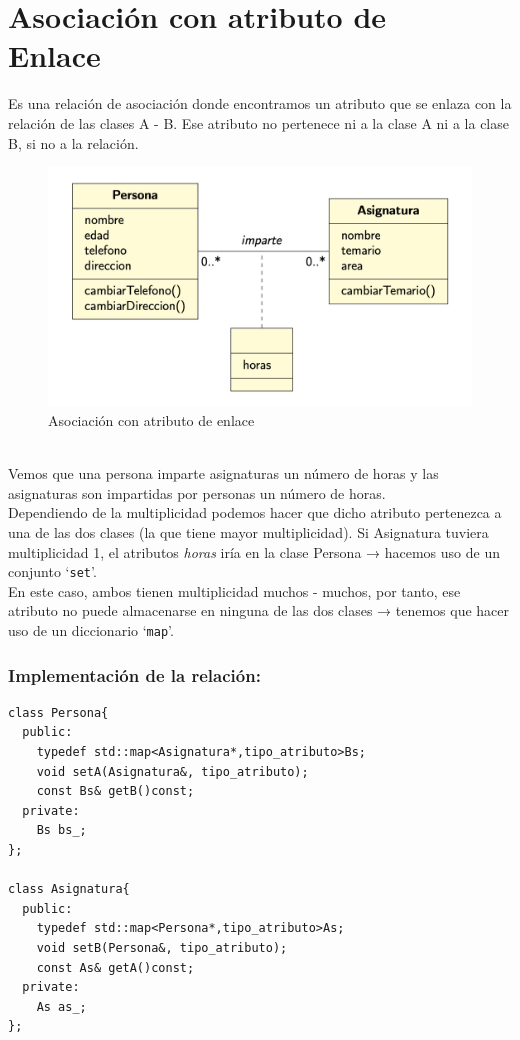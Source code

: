 \chapter{Asociación con atributo de\\ Enlace}
Es una relación de asociación donde encontramos un atributo que se enlaza con la relación de las clases A - B.
Ese atributo no pertenece ni a la clase A ni a la clase B, si no a la relación.
\begin{figure}[h]
	\centering
	\includegraphics[width=\textwidth]{Imagenes/atribenlace.png}
	\caption{Asociación con atributo de enlace}
\end{figure}
\\
Vemos que una persona imparte asignaturas un número de horas y las asignaturas son impartidas por personas un número de horas.\vspace*{0.2cm}\\
Dependiendo de la multiplicidad podemos hacer que dicho atributo pertenezca a una de las dos clases (la que tiene mayor multiplicidad).\vspace*{0.2cm}
Si Asignatura tuviera multiplicidad 1, el atributos \textit{horas} iría en la clase Persona → hacemos uso de un conjunto ‘\texttt{set}’.\vspace*{0.2cm}\\
En este caso, ambos tienen multiplicidad muchos - muchos, por tanto, ese atributo no puede almacenarse en ninguna de las dos clases → tenemos que hacer uso de un diccionario ‘\texttt{map}’.
\newpage
\subsection{Implementación de la relación:}

\begin{center}
	\begin{lstlisting}[frame=single]
class Persona{
  public:
    typedef std::map<Asignatura*,tipo_atributo>Bs;
    void setA(Asignatura&, tipo_atributo);
    const Bs& getB()const;
  private:
    Bs bs_;
};

class Asignatura{
  public:
    typedef std::map<Persona*,tipo_atributo>As;
    void setB(Persona&, tipo_atributo);
    const As& getA()const;
  private:
    As as_;
};
\end{lstlisting}
\end{center}
